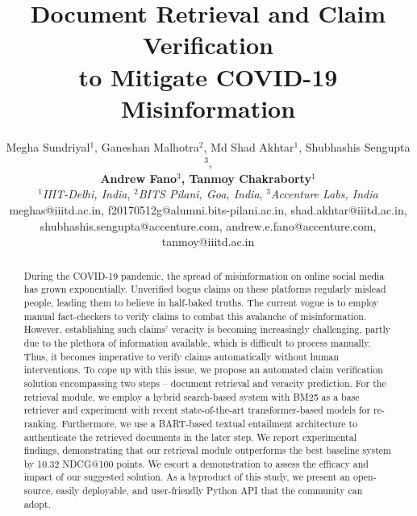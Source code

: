 \documentclass[11pt]{article}
\title{Document Retrieval and Claim Verification \\to Mitigate COVID-19 Misinformation}
\author{Megha Sundriyal$^1$, Ganeshan Malhotra$^2$, Md Shad Akhtar$^1$, Shubhashis              Sengupta$^3$, \\ {\large \bf Andrew Fano$^3$, Tanmoy Chakraborty$^1$}\\
        $^1$\textit {IIIT-Delhi, India}, 
        $^2$\textit{BITS Pilani, Goa, India},
        $^3$\textit{Accenture Labs, India} \\
        meghas@iiitd.ac.in,  f20170512g@alumni.bits-pilani.ac.in, shad.akhtar@iiitd.ac.in,\\
        shubhashis.sengupta@accenture.com, andrew.e.fano@accenture.com, tanmoy@iiitd.ac.in
        }
\begin{document}
\maketitle
\begin{abstract}
During the COVID-19 pandemic, the spread of misinformation on online social media has grown exponentially. Unverified bogus claims on these platforms regularly mislead people, leading them to believe in half-baked truths. The current vogue is to employ manual fact-checkers to verify claims to combat this avalanche of misinformation. However, establishing such claims' veracity is becoming increasingly challenging, partly due to the plethora of information available, which is difficult to process manually. Thus, it becomes imperative to verify claims automatically without human interventions. To cope up with this issue, we propose an automated claim verification solution encompassing two steps -- document retrieval and veracity prediction. For the retrieval module, we employ a hybrid search-based system with BM25 as a base retriever and experiment with recent state-of-the-art transformer-based models for re-ranking. Furthermore, we use a BART-based textual entailment architecture to authenticate the retrieved documents in the later step. We report experimental findings, demonstrating that our retrieval module outperforms the best baseline system by 10.32 NDCG@100 points. We escort a demonstration to assess the efficacy and impact of our suggested solution. As a byproduct of this study, we present an open-source, easily deployable, and user-friendly Python API that the community can adopt. 
\end{abstract}
\end{document}
